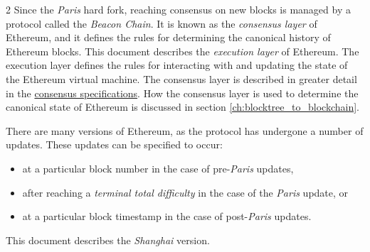 \documentclass[9pt,oneside]{amsart}
\begin{document}
\begin{multicols}{2}
Since the \textit{Paris} hard fork, reaching consensus on new blocks is managed by a protocol called the \textit{Beacon Chain}.
It is known as the \textit{consensus layer} of Ethereum, and it defines the rules for determining the canonical history of Ethereum blocks.
This document describes the \textit{execution layer} of Ethereum.
The execution layer defines the rules for interacting with and updating the state of the Ethereum virtual machine.
The consensus layer is described in greater detail in the \href{https://github.com/ethereum/consensus-specs}{consensus specifications}.
How the consensus layer is used to determine the canonical state of Ethereum is discussed in section \ref{ch:blocktree_to_blockchain}.

There are many versions of Ethereum, as the protocol has undergone a number of updates.
These updates can be specified to occur:
\begin{itemize}
  \item at a particular block number in the case of pre-\textit{Paris} updates,
  \item after reaching a \textit{terminal total difficulty} in the case of the \textit{Paris} update, or
  \item at a particular block timestamp in the case of post-\textit{Paris} updates.
\end{itemize}
This document describes the \textit{Shanghai} version.


\end{multicols}
\end{document}
